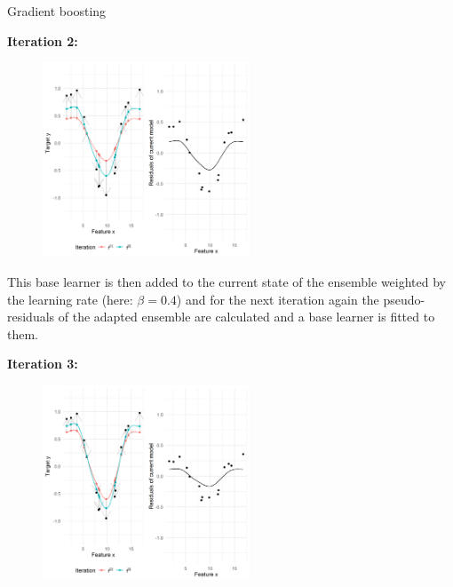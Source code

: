 \begin{vbframe}{Gradient boosting}
\begin{footnotesize}
\vspace*{0.1cm}
\textbf{Iteration 2:}
\begin{figure}
  \includegraphics[width=0.55\textwidth]{figure_man/gradient-boosting02.png}
\end{figure}
\end{footnotesize}
\framebreak
\begin{footnotesize}
This base learner is then added to the current state of the ensemble weighted by the learning rate (here: $\beta = 0.4$) and for the next iteration again the pseudo-residuals of the adapted ensemble are calculated and a base learner is fitted to them.


\vspace*{0.1cm}
\textbf{Iteration 3:}
\begin{figure}
  \includegraphics[width=0.55\textwidth]{figure_man/gradient-boosting03.png}
\end{figure}

\end{footnotesize}
\end{vbframe}
